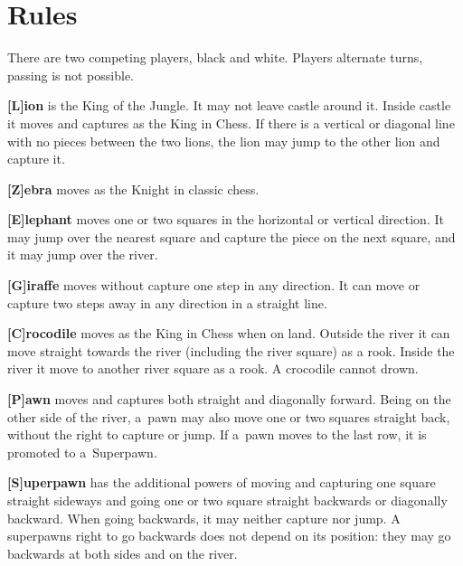 \section{Rules}

There are two competing players, black and white. Players alternate turns,
passing is not possible.

\vspace{0.5em}

\textbf{[L]ion}
is the King of the Jungle. It may not leave castle around it. Inside castle
it moves and captures as the King in Chess. If there is a vertical or diagonal
line with no pieces between the two lions, the lion may jump to the other lion
and capture it.

\vspace{0.5em}

\textbf{[Z]ebra}
moves as the Knight in classic chess.

\vspace{0.5em}

\textbf{[E]lephant}
moves one or two squares in the horizontal or vertical direction. It may jump
over the nearest square and capture the piece on the next square, and it may
jump over the river.

\vspace{0.5em}

\textbf{[G]iraffe}
moves without capture one step in any direction. It can move or capture two
steps away in any direction in a straight line.

\vspace{0.5em}

\textbf{[C]rocodile}
moves as the King in Chess when on land. Outside the river it can move
straight towards the river (including the river square) as a rook. Inside the
river it move to another river square as a rook. A crocodile cannot drown.

\vspace{0.5em}

\textbf{[P]awn}
moves and captures both straight and diagonally forward. Being on the other
side of the river, a~pawn may also move one or two squares straight back,
without the right to capture or jump. If a~pawn moves to the last row, it is
promoted to a~Superpawn.

\vspace{0.5em}

\textbf{[S]uperpawn}
has the additional powers of moving and capturing one square straight sideways
and going one or two square straight backwards or diagonally backward. When
going backwards, it may neither capture nor jump. A superpawns right to go
backwards does not depend on its position: they may go backwards at both sides
and on the river.

